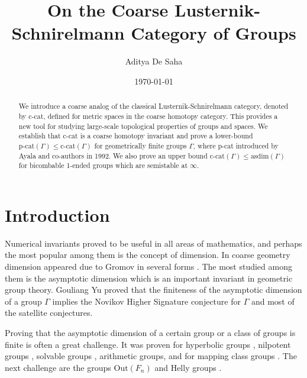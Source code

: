 \documentclass {amsart}
\title{On the Coarse Lusternik-Schnirelmann Category of Groups}
\author{Aditya De Saha}
\date{\today}
\newcommand {\Out}      {\text{Out}}
\newcommand {\ccat}     {\text{c-cat}}
\newcommand {\pcat}     {\text{p-cat}}
\newcommand {\asdim}    {\text{asdim}}
\theoremstyle {definition}
\begin{document}
\begin{abstract}
    We introduce a coarse analog of the classical Lusternik-Schnirelmann category,
    denoted by \( \ccat \), defined for metric spaces in the coarse homotopy
    category. This provides a new tool for studying large-scale
    topological properties of groups and spaces. We establish that \( \ccat \) is
    a coarse homotopy invariant and prove a lower-bound \( \pcat(\Gamma)
    \leq \ccat(\Gamma) \) for geometrically finite groups \( \Gamma \), where \(
    \pcat \) introduced by Ayala and co-authors in 1992. We also prove an upper
    bound \( \ccat(\Gamma) \leq \asdim (\Gamma) \) for bicombable 1-ended groups
    which are semistable at \( \infty \).
\end{abstract}

\maketitle

\section {Introduction}

Numerical invariants proved to be useful in all areas of mathematics, and
perhaps the most popular among them is the concept of dimension. In coarse
geometry dimension appeared due to Gromov in several forms
\cite{gromovAsymptoticInvariantsInfinite1993, 
      gromovPositiveCurvatureMacroscopic1996}.
The most studied among them is the asymptotic dimension
\cite{bellAsymptoticDimension2008} 
which is an important invariant in geometric group theory. Gouliang Yu proved
\cite{yuNovikovConjectureGroups1998}
that the finiteness of the asymptotic dimension of a group $ \Gamma $
implies the Novikov Higher Signature conjecture for $ \Gamma $
and most of the satellite conjectures.

Proving that the asymptotic dimension of a certain group or a class of groups
is finite is often a great challenge. It was proven for hyperbolic
groups 
\cite{gromovHyperbolicGroups1987,roeHyperbolicGroupsHave2005},
nilpotent groups 
\cite{bellAsymptoticDimension2008},
solvable groups 
\cite{dranishnikovAsymptoticDimensionDiscrete2006},
arithmetic groups,
\cite{jiAsymptoticDimensionIntegral2004}
and for mapping class groups
\cite{bestvinaAsymptoticDimensionMapping2010}.
The next challenge are the groups 
$ \Out(F_n) $
and Helly groups 
\cite{bandeltCliqueGraphsHelly1991,chalopinHellyGroups2025}.
\end{document}
